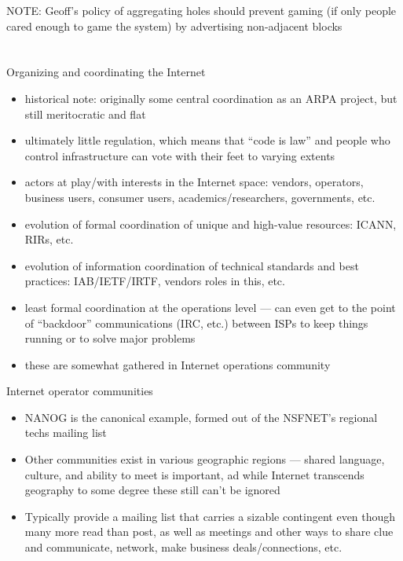 NOTE: Geoff's policy of aggregating holes should prevent gaming (if only people
cared enough to game the system) by advertising non-adjacent blocks

\section{}

Organizing and coordinating the Internet
\begin{itemize}
    \item{historical note: originally some central coordination as an ARPA
    project, but still meritocratic and flat}
    \item{ultimately little regulation, which means that ``code is law'' and
    people who control infrastructure can vote with their feet to varying
    extents}
    \item{actors at play/with interests in the Internet space: vendors,
    operators, business users, consumer users, academics/researchers,
    governments, etc.}
    \item{evolution of formal coordination of unique and high-value resources:
    ICANN, RIRs, etc.}
    \item{evolution of information coordination of technical standards and best
    practices: IAB/IETF/IRTF, vendors roles in this, etc.}
    \item{least formal coordination at the operations level — can even get to
    the point of ``backdoor'' communications (IRC, etc.) between ISPs to keep
    things running or to solve major problems}
    \item{these are somewhat gathered in Internet operations community}
\end{itemize}

Internet operator communities
\begin{itemize}
    \item{NANOG is the canonical example, formed out of the NSFNET's regional
    techs mailing list}
    \item{Other communities exist in various geographic regions — shared
    language, culture, and ability to meet is important, ad while Internet
    transcends geography to some degree these still can't be ignored}
    \item{Typically provide a mailing list that carries a sizable contingent
    even though many more read than post, as well as meetings and other ways to
    share clue and communicate, network, make business deals/connections, etc.}
\end{itemize}
